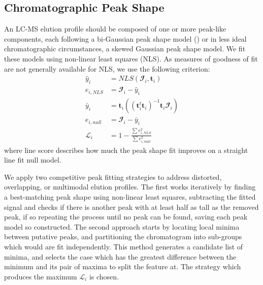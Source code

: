 \documentclass{article}
\begin{document}
    \subsection{Chromatographic Peak Shape}
        An LC-MS elution profile should be composed of one or more peak-like components, each
        following a bi-Gaussian peak shape model (\cite{Yu2010}) or in less ideal chromatographic
        circumstances, a skewed Gaussian peak shape model. We fit these models using non-linear
        least squares (NLS). As measures of goodness of fit are not generally available for NLS,
        we use the following criterion:
        \begin{align}
            {\hat y_i} &= NLS(\mathbfcal{I}_i, \mathbf{t}_i) \nonumber\\
            e_{i, NLS} &= \mathbfcal{I}_i - {\hat y_i} \nonumber\\
            {\bar y_i} &= \mathbf{t}_i
                \left(
                    \left(
                        \mathbf{t}_i^t\mathbf{t}_i
                    \right)^{-1}\mathbf{t}_i\mathbfcal{I}_i
                \right)\nonumber\\
            e_{i, null} &= \mathbfcal{I}_i - {\bar y_i} \nonumber\\
            \mathscr{L}_i &= 1 - \frac{\sum{e_{i, NLS}^2}}{\sum{e_{i, null}^2}}
        \end{align}
        \noindent where line score describes how much the peak shape fit improves on a straight
        line fit null model.

        We apply two competitive peak fitting strategies to address distorted, overlapping, or
        multimodal elution profiles. The first works iteratively by finding a best-matching peak
        shape using non-linear least squares, subtracting the fitted signal and checks if there is
        another peak with at least half as tall as the removed peak, if so repeating the process until
        no peak can be found, saving each peak model so constructed. The second approach starts
        by locating local minima between putative peaks, and partitioning the chromatogram into
        sub-groups which would are fit independently. This method generates a candidate list of
        minima, and selects the case which has the greatest difference between the minimum and its
        pair of maxima to split the feature at. The strategy which produces the maximum $\mathscr{L}_i$
        is chosen.
\end{document}
